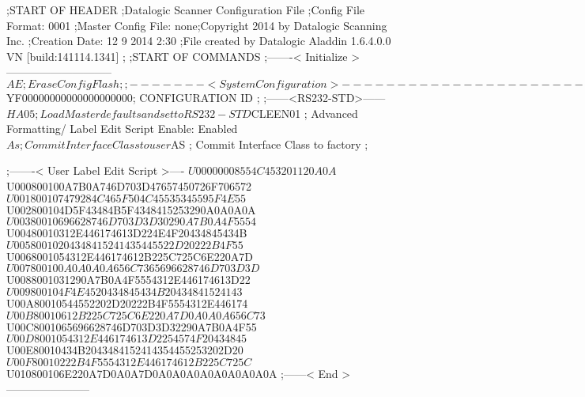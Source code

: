 ;START OF HEADER
;Datalogic Scanner Configuration File
;Config File Format: 0001
;Master Config File: none;Copyright 2014 by Datalogic Scanning Inc.
;Creation Date: 12 9 2014 2:30
;File created by Datalogic Aladdin 1.6.4.0.0 VN [build:141114.1341]
;
;START OF COMMANDS
;-------< Initialize >-----------------------------
$AE                 ; Erase Config Flash
;
;-------< System Configuration >-------------------------------
$YF00000000000000000000; CONFIGURATION ID
;
;------<RS232-STD>------
$HA05               ; Load Master defaults and set to RS232-STD
$CLEEN01            ; Advanced Formatting/ Label Edit Script Enable: Enabled
$As                 ; Commit Interface Class to user
$AS                 ; Commit Interface Class to factory
;

;-------< User Label Edit Script >----
$U00000008554C453201120A0A
$U000800100A7B0A746D703D47657450726F706572
$U001800107479284C465F504C45535345595F4E55
$U002800104D5F43484B5F4348415253290A0A0A0A
$U00380010696628746D703D3D30290A7B0A4F5554
$U00480010312E446174613D224E4F20434845434B
$U00580010204348415241435445522D20222B4F55
$U0068001054312E446174612B225C725C6E220A7D
$U007800100A0A0A0A656C7365696628746D703D3D
$U0088001031290A7B0A4F5554312E446174613D22
$U009800104F4E4520434845434B20434841524143
$U00A80010544552202D20222B4F5554312E446174
$U00B80010612B225C725C6E220A7D0A0A0A656C73
$U00C8001065696628746D703D3D32290A7B0A4F55
$U00D8001054312E446174613D2254574F20434845
$U00E80010434B2043484152414354455253202D20
$U00F80010222B4F5554312E446174612B225C725C
$U010800106E220A7D0A0A7D0A0A0A0A0A0A0A0A0A
;------< End >-----------------------
